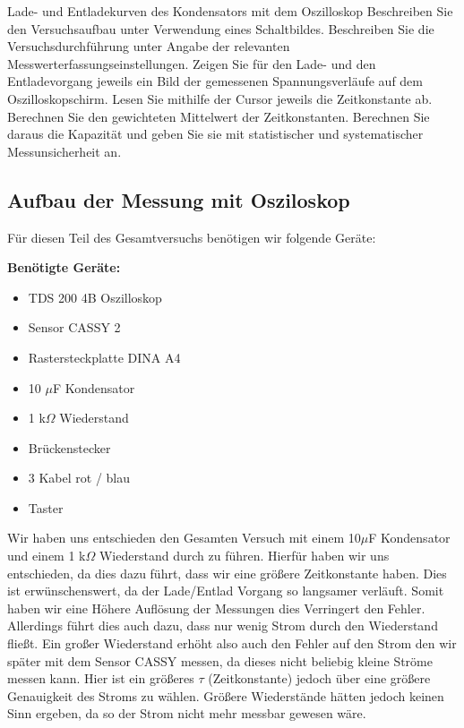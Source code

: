 \documentclass[twoside]{protokoll}
\begin{document}
\begin{aufgabe}{Lade- und Entladekurven des Kondensators mit dem Oszilloskop}
  Beschreiben Sie den Versuchsaufbau unter Verwendung eines
  Schaltbildes. Beschreiben Sie die Versuchsdurchführung unter Angabe
  der relevanten Messwerterfassungseinstellungen. Zeigen Sie für den
  Lade- und den Entladevorgang jeweils ein Bild der gemessenen
  Spannungsverläufe auf dem Oszilloskopschirm. Lesen Sie mithilfe der
  Cursor jeweils die Zeitkonstante ab. Berechnen Sie den gewichteten
  Mittelwert der Zeitkonstanten. Berechnen Sie daraus die Kapazität
  und geben Sie sie mit statistischer und systematischer
  Messunsicherheit an.
  
\subsection{Aufbau der Messung mit Osziloskop}  
   
  Für diesen Teil des Gesamtversuchs benötigen wir folgende Geräte:
  
  \textbf{Benötigte Geräte:}
  \begin{itemize}
  	\item TDS 200 4B Oszilloskop
  	\item Sensor CASSY 2
  	\item Rastersteckplatte DINA A4
  	\item 10 $\mu$F Kondensator
  	\item 1 k$\Omega$ Wiederstand
  	\item Brückenstecker
  	\item 3 Kabel rot / blau
  	\item Taster
  \end{itemize}   

  Wir haben uns entschieden den Gesamten Versuch mit einem 10$\mu$F Kondensator und einem 
  1 k$\Omega$ Wiederstand durch zu führen. Hierfür haben wir uns entschieden, da dies dazu
  führt, dass wir eine größere Zeitkonstante haben. Dies ist erwünschenswert, da der 
  Lade/Entlad  Vorgang so langsamer verläuft. Somit haben wir eine Höhere Auflösung 
  der Messungen dies Verringert den Fehler. Allerdings führt dies auch dazu, dass nur wenig
  Strom durch den Wiederstand fließt. Ein großer Wiederstand erhöht also auch den Fehler auf 
  den Strom den wir später mit dem Sensor CASSY messen, da dieses nicht beliebig kleine 
  Ströme messen kann. Hier ist ein größeres $\tau$ (Zeitkonstante) jedoch über eine größere
  Genauigkeit des Stroms zu wählen. Größere Wiederstände hätten jedoch keinen Sinn ergeben, 
  da so der Strom nicht mehr messbar gewesen wäre.
  

\end{aufgabe}
\end{document}
